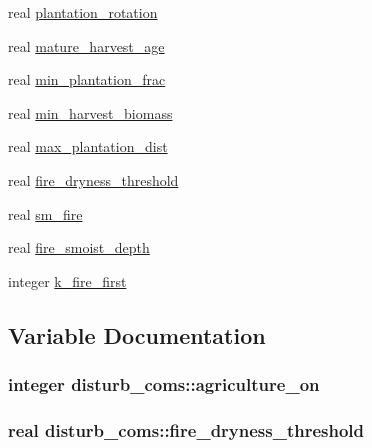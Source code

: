 \begin{DoxyCompactItemize}
real \hyperlink{namespacedisturb__coms_a376a3a991d013bb7fc01f11392b85e71}{plantation\+\_\+rotation}
\item 
real \hyperlink{namespacedisturb__coms_af53cc051638d63f8646b4e46eef9366a}{mature\+\_\+harvest\+\_\+age}
\item 
real \hyperlink{namespacedisturb__coms_a05d657ee432105896bdb7fce6388217a}{min\+\_\+plantation\+\_\+frac}
\item 
real \hyperlink{namespacedisturb__coms_ab882a91f3ed60ed6a1532793d166e34d}{min\+\_\+harvest\+\_\+biomass}
\item 
real \hyperlink{namespacedisturb__coms_a0591e026b4cc3e583767cc06fe811531}{max\+\_\+plantation\+\_\+dist}
\item 
real \hyperlink{namespacedisturb__coms_ac6b6e373955307b8433f33253ca71d3d}{fire\+\_\+dryness\+\_\+threshold}
\item 
real \hyperlink{namespacedisturb__coms_a78e160b31b155e0e0dbddbe1c6614c1c}{sm\+\_\+fire}
\item 
real \hyperlink{namespacedisturb__coms_a62195251813b8226366eb5ae407dd196}{fire\+\_\+smoist\+\_\+depth}
\item 
integer \hyperlink{namespacedisturb__coms_a867cc15822253a03763c6890d6bdabc9}{k\+\_\+fire\+\_\+first}
\end{DoxyCompactItemize}


\subsection{Variable Documentation}
\subsubsection[{\texorpdfstring{agriculture\+\_\+on}{agriculture_on}}]{\setlength{\rightskip}{0pt plus 5cm}integer disturb\+\_\+coms\+::agriculture\+\_\+on}\hypertarget{namespacedisturb__coms_a42942f09e1f80adbb629f5bc82d36127}{}\label{namespacedisturb__coms_a42942f09e1f80adbb629f5bc82d36127}
\subsubsection[{\texorpdfstring{fire\+\_\+dryness\+\_\+threshold}{fire_dryness_threshold}}]{\setlength{\rightskip}{0pt plus 5cm}real disturb\+\_\+coms\+::fire\+\_\+dryness\+\_\+threshold}\hypertarget{namespacedisturb__coms_ac6b6e373955307b8433f33253ca71d3d}{}\label{namespacedisturb__coms_ac6b6e373955307b8433f33253ca71d3d}
